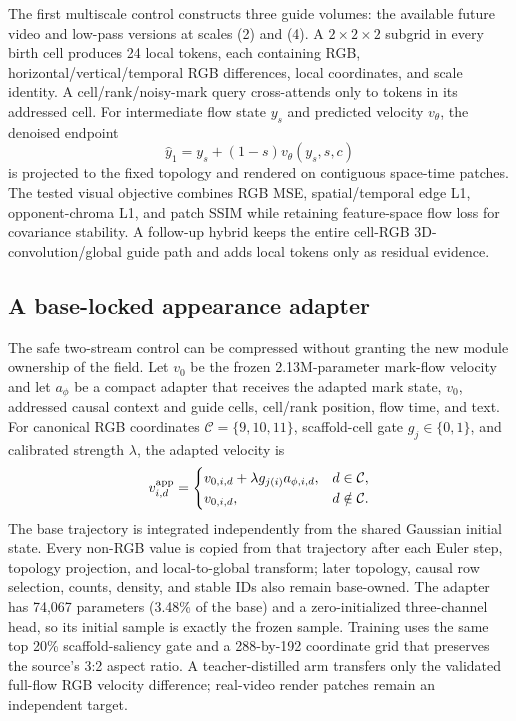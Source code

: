 \documentclass[10pt]{article}
\begin{document}
The first multiscale control constructs three guide volumes: the available future video and
low-pass versions at scales (2) and (4). A \(2\times2\times2\) subgrid in every birth cell
produces 24 local tokens, each containing RGB, horizontal/vertical/temporal RGB differences, local
coordinates, and scale identity. A cell/rank/noisy-mark query cross-attends only to tokens in its
addressed cell. For intermediate flow state \(y_s\) and predicted velocity \(v_\theta\), the
denoised endpoint
\begin{equation}
\hat y_1 = y_s + (1-s)v_\theta(y_s,s,c)
\end{equation}
is projected to the fixed topology and rendered on contiguous space-time patches. The tested
visual objective combines RGB MSE, spatial/temporal edge L1, opponent-chroma L1, and patch SSIM
while retaining feature-space flow loss for covariance stability. A follow-up hybrid keeps the
entire cell-RGB 3D-convolution/global guide path and adds local tokens only as residual evidence.

\subsection{A base-locked appearance adapter}

The safe two-stream control can be compressed without granting the new module ownership of the
field. Let $v_0$ be the frozen 2.13M-parameter mark-flow velocity and let $a_\phi$ be a compact
adapter that receives the adapted mark state, $v_0$, addressed causal context and guide cells,
cell/rank position, flow time, and text. For canonical RGB coordinates
$\mathcal C=\{9,10,11\}$, scaffold-cell gate $g_j\in\{0,1\}$, and calibrated strength $\lambda$,
the adapted velocity is
\begin{equation}
v^{\rm app}_{i,d}=\begin{cases}
v_{0,i,d}+\lambda g_{j(i)}a_{\phi,i,d}, & d\in\mathcal C,\\
v_{0,i,d}, & d\notin\mathcal C.
\end{cases}
\end{equation}
The base trajectory is integrated independently from the shared Gaussian initial state. Every
non-RGB value is copied from that trajectory after each Euler step, topology projection, and
local-to-global transform; later topology, causal row selection, counts, density, and stable IDs
also remain base-owned. The adapter has 74,067 parameters (3.48\% of the base) and a zero-initialized
three-channel head, so its initial sample is exactly the frozen sample. Training uses the same top
20\% scaffold-saliency gate and a 288-by-192 coordinate grid that preserves the source's 3:2 aspect
ratio. A teacher-distilled arm transfers only the validated full-flow RGB velocity difference;
real-video render patches remain an independent target.
\end{document}
